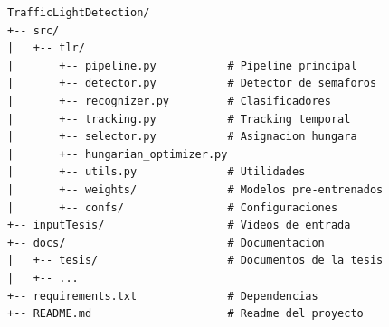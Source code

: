 \begin{verbatim}
TrafficLightDetection/
+-- src/
|   +-- tlr/
|       +-- pipeline.py           # Pipeline principal
|       +-- detector.py           # Detector de semaforos
|       +-- recognizer.py         # Clasificadores
|       +-- tracking.py           # Tracking temporal
|       +-- selector.py           # Asignacion hungara
|       +-- hungarian_optimizer.py
|       +-- utils.py              # Utilidades
|       +-- weights/              # Modelos pre-entrenados
|       +-- confs/                # Configuraciones
+-- inputTesis/                   # Videos de entrada
+-- docs/                         # Documentacion
|   +-- tesis/                    # Documentos de la tesis
|   +-- ...
+-- requirements.txt              # Dependencias
+-- README.md                     # Readme del proyecto
\end{verbatim}
